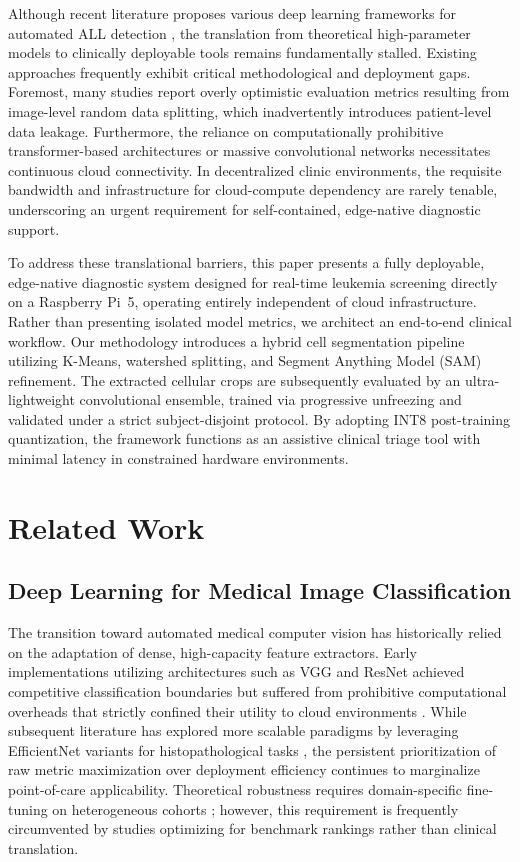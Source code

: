 \documentclass[journal]{IEEEtran}
\begin{document}
Although recent literature proposes various deep learning frameworks for automated ALL detection \cite{b3, b4, b6, b7, b10}, the translation from theoretical high-parameter models to clinically deployable tools remains fundamentally stalled. Existing approaches frequently exhibit critical methodological and deployment gaps. Foremost, many studies report overly optimistic evaluation metrics resulting from image-level random data splitting, which inadvertently introduces patient-level data leakage. Furthermore, the reliance on computationally prohibitive transformer-based architectures or massive convolutional networks necessitates continuous cloud connectivity. In decentralized clinic environments, the requisite bandwidth and infrastructure for cloud-compute dependency are rarely tenable, underscoring an urgent requirement for self-contained, edge-native diagnostic support.

To address these translational barriers, this paper presents a fully deployable, edge-native diagnostic system designed for real-time leukemia screening directly on a Raspberry Pi~5, operating entirely independent of cloud infrastructure. Rather than presenting isolated model metrics, we architect an end-to-end clinical workflow. Our methodology introduces a hybrid cell segmentation pipeline utilizing K-Means, watershed splitting, and Segment Anything Model (SAM) refinement. The extracted cellular crops are subsequently evaluated by an ultra-lightweight convolutional ensemble, trained via progressive unfreezing and validated under a strict subject-disjoint protocol. By adopting INT8 post-training quantization, the framework functions as an assistive clinical triage tool with minimal latency in constrained hardware environments.

\section{Related Work}

\subsection{Deep Learning for Medical Image Classification}
The transition toward automated medical computer vision has historically relied on the adaptation of dense, high-capacity feature extractors. Early implementations utilizing architectures such as VGG and ResNet achieved competitive classification boundaries but suffered from prohibitive computational overheads that strictly confined their utility to cloud environments \cite{b2}. While subsequent literature has explored more scalable paradigms by leveraging EfficientNet variants for histopathological tasks \cite{b12}, the persistent prioritization of raw metric maximization over deployment efficiency continues to marginalize point-of-care applicability. Theoretical robustness requires domain-specific fine-tuning on heterogeneous cohorts \cite{b1}; however, this requirement is frequently circumvented by studies optimizing for benchmark rankings rather than clinical translation.
\end{document}
